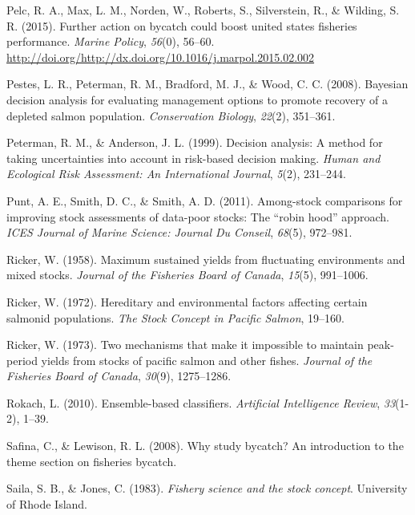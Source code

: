 \documentclass[12pt,]{scrartcl}
\begin{document}
\hypertarget{ref-Pelc201556}{}
Pelc, R. A., Max, L. M., Norden, W., Roberts, S., Silverstein, R., \&
Wilding, S. R. (2015). Further action on bycatch could boost united
states fisheries performance. \emph{Marine Policy}, \emph{56}(0),
56--60.
\url{http://doi.org/http://dx.doi.org/10.1016/j.marpol.2015.02.002}

\hypertarget{ref-pestes2008bayesian}{}
Pestes, L. R., Peterman, R. M., Bradford, M. J., \& Wood, C. C. (2008).
Bayesian decision analysis for evaluating management options to promote
recovery of a depleted salmon population. \emph{Conservation Biology},
\emph{22}(2), 351--361.

\hypertarget{ref-peterman1999decision}{}
Peterman, R. M., \& Anderson, J. L. (1999). Decision analysis: A method
for taking uncertainties into account in risk-based decision making.
\emph{Human and Ecological Risk Assessment: An International Journal},
\emph{5}(2), 231--244.

\hypertarget{ref-punt2011among}{}
Punt, A. E., Smith, D. C., \& Smith, A. D. (2011). Among-stock
comparisons for improving stock assessments of data-poor stocks: The
``robin hood'' approach. \emph{ICES Journal of Marine Science: Journal
Du Conseil}, \emph{68}(5), 972--981.

\hypertarget{ref-ricker1958maximum}{}
Ricker, W. (1958). Maximum sustained yields from fluctuating
environments and mixed stocks. \emph{Journal of the Fisheries Board of
Canada}, \emph{15}(5), 991--1006.

\hypertarget{ref-ricker1972hereditary}{}
Ricker, W. (1972). Hereditary and environmental factors affecting
certain salmonid populations. \emph{The Stock Concept in Pacific
Salmon}, 19--160.

\hypertarget{ref-ricker1973two}{}
Ricker, W. (1973). Two mechanisms that make it impossible to maintain
peak-period yields from stocks of pacific salmon and other fishes.
\emph{Journal of the Fisheries Board of Canada}, \emph{30}(9),
1275--1286.

\hypertarget{ref-rokach2010ensemble}{}
Rokach, L. (2010). Ensemble-based classifiers. \emph{Artificial
Intelligence Review}, \emph{33}(1-2), 1--39.

\hypertarget{ref-safina2008study}{}
Safina, C., \& Lewison, R. L. (2008). Why study bycatch? An introduction
to the theme section on fisheries bycatch.

\hypertarget{ref-saila1983fishery}{}
Saila, S. B., \& Jones, C. (1983). \emph{Fishery science and the stock
concept}. University of Rhode Island.
\end{document}
